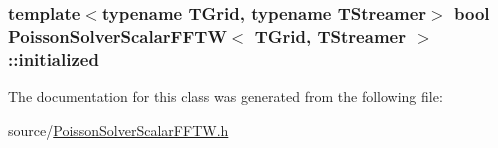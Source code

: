 \subsubsection[{initialized}]{\setlength{\rightskip}{0pt plus 5cm}template$<$typename T\+Grid, typename T\+Streamer$>$ bool {\bf Poisson\+Solver\+Scalar\+F\+F\+T\+W}$<$ T\+Grid, T\+Streamer $>$\+::initialized\hspace{0.3cm}{\ttfamily [protected]}}\label{class_poisson_solver_scalar_f_f_t_w_a14ffa693193fcc1d5391c452dcf11d34}


The documentation for this class was generated from the following file\+:\begin{DoxyCompactItemize}
\item 
source/\hyperlink{_poisson_solver_scalar_f_f_t_w_8h}{Poisson\+Solver\+Scalar\+F\+F\+T\+W.\+h}\end{DoxyCompactItemize}
